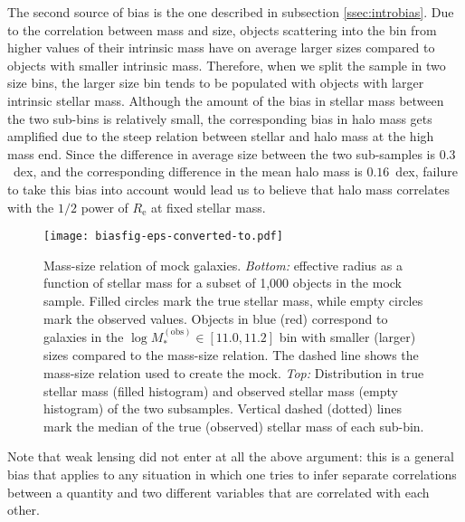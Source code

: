 \documentclass[usenatbib]{mnras}
\def\mobs{M_*^{\mathrm{(obs)}}}
\def\reff{R_{\mathrm{e}}}
\begin{document}
The second source of bias is the one described in subsection \ref{ssec:introbias}.
Due to the correlation between mass and size, objects scattering into the bin from higher values of their intrinsic mass have on average larger sizes compared to objects with smaller intrinsic mass.
Therefore, when we split the sample in two size bins, the larger size bin tends to be populated with objects 
with larger intrinsic stellar mass.
Although the amount of the bias in stellar mass between the two sub-bins is relatively small, the corresponding bias in halo mass gets amplified due to the steep relation between stellar and halo mass at the high mass end.
Since the difference in average size between the two sub-samples is $0.3$~dex, and the corresponding difference in the mean halo mass is $0.16$~dex, failure to take this bias into account would lead us to believe that halo mass correlates with the $1/2$ power of $\reff$ at fixed stellar mass.
%
\begin{figure}
 \texttt{[image: biasfig-eps-converted-to.pdf]}
 \caption{Mass-size relation of mock galaxies. {\em Bottom:} effective radius as a function of stellar mass for a subset of 1,000 objects in the mock sample. Filled circles mark the true stellar mass, while empty circles mark the observed values. Objects in blue (red) correspond to galaxies in the $\log{\mobs}\in[11.0,11.2]$ bin with smaller (larger) sizes compared to the mass-size relation. 
The dashed line shows the mass-size relation used to create the mock.
{\em Top:} Distribution in true stellar mass (filled histogram) and observed stellar mass (empty histogram) of the two subsamples. Vertical dashed (dotted) lines mark the median of the true (observed) stellar mass of each sub-bin.}
 \label{fig:bias}
\end{figure}

Note that weak lensing did not enter at all the above argument: this is a general bias that applies to any situation in which one tries to infer separate correlations between a quantity and two different variables that are correlated with each other.
\end{document}
